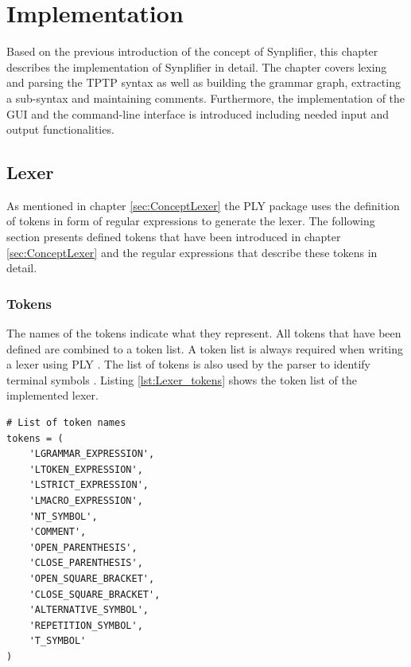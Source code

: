 
\chapter{Implementation}\label{cha:Implementation}

Based on the previous introduction of the concept of Synplifier, this chapter describes the implementation of Synplifier in detail. The chapter covers lexing and parsing the \ac{TPTP} syntax as well as building the grammar graph, extracting a sub-syntax and maintaining comments.
Furthermore, the implementation of the GUI and the command-line interface is introduced including needed input and output functionalities.

\section{Lexer}\label{sec:ImplementationLexer}

As mentioned in chapter \ref{sec:ConceptLexer} the \ac{PLY} package uses the definition of tokens in form of regular expressions to generate the lexer. The following section presents defined tokens that have been introduced in chapter \ref{sec:ConceptLexer} and the regular expressions that describe these tokens in detail.

\subsection{Tokens}\label{sec:ImplementationLexerToken}

The names of the tokens indicate what they represent. 
All tokens that have been defined are combined to a token list.
A token list is always required when writing a lexer using \ac{PLY} \cite{PLY}.
The list of tokens is also used by the parser to identify terminal symbols \cite{PLY}.
Listing \ref{lst:Lexer_tokens} shows the token list of the implemented lexer.

\begin{lstlisting}[language=None,basicstyle=\scriptsize	,caption= Lexer tokens,label= lst:Lexer_tokens]
# List of token names
tokens = (
    'LGRAMMAR_EXPRESSION',
    'LTOKEN_EXPRESSION',
    'LSTRICT_EXPRESSION',
    'LMACRO_EXPRESSION',
    'NT_SYMBOL',
    'COMMENT',
    'OPEN_PARENTHESIS',
    'CLOSE_PARENTHESIS',
    'OPEN_SQUARE_BRACKET',
    'CLOSE_SQUARE_BRACKET',
    'ALTERNATIVE_SYMBOL',
    'REPETITION_SYMBOL',
    'T_SYMBOL'
)
\end{lstlisting}

